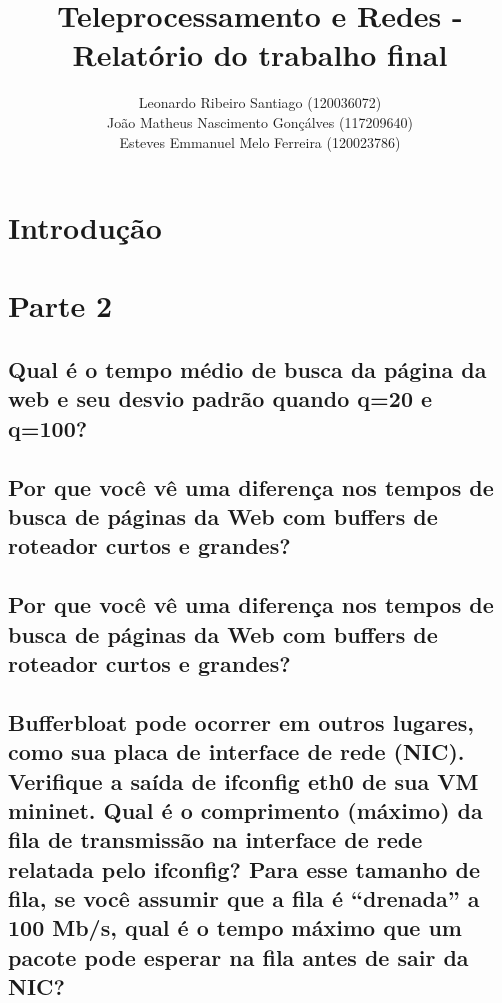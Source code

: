 \documentclass[a4paper,12pt]{article}
\title{Teleprocessamento e Redes - Relatório do trabalho final}
\author{
  Leonardo Ribeiro Santiago (120036072) \\
  João Matheus Nascimento Gonçálves (117209640) \\
  Esteves Emmanuel Melo Ferreira (120023786) }
\date{}
\begin{document}
\maketitle

\section{Introdução}

\section{Parte 2}

\subsection{Qual é o tempo médio de busca da página da web e seu desvio padrão quando q=20 e q=100?}

\subsection{Por que você vê uma diferença nos tempos de busca de páginas da Web com buffers de roteador curtos e grandes?}

\subsection{Por que você vê uma diferença nos tempos de busca de páginas da Web com buffers de roteador curtos e grandes?}

\subsection{Bufferbloat pode ocorrer em outros lugares, como sua placa de interface de rede (NIC). Verifique a saída de ifconfig eth0 de sua VM mininet. Qual é o comprimento (máximo) da fila de transmissão na interface de rede relatada pelo ifconfig? Para esse tamanho de fila, se você assumir que a fila é “drenada” a 100 Mb/s, qual é o tempo máximo que um pacote pode esperar na fila antes de sair da NIC?
}

\end{document}
